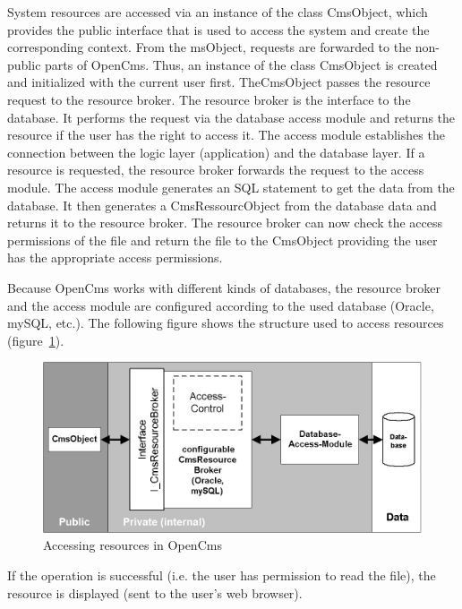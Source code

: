System resources are accessed via an instance of the class {\name CmsObject},
which provides the public interface that is used to access the system
and create the corresponding context. From the {\name msObject}, requests are
forwarded to the non-public parts of OpenCms. Thus, an instance of the
class {\name CmsObject} is created and initialized with the current user first.
The{\name CmsObject} passes the resource request to the resource broker. The
{\name resource broker} is the interface to the database. It performs the
request via the database access module and returns the resource if the
user has the right to access it. The access module establishes the
connection between the logic layer (application) and the database layer.
If a resource is requested, the {\name resource broker} forwards the request to
the access module. The access module generates an SQL statement to get
the data from the database. It then generates a {\name CmsRessourcObject} from
the database data and returns it to the resource broker. The {\name resource
broker} can now check the access permissions of the file and return the
file to the {\name CmsObject} providing the user has the appropriate access
permissions.

Because OpenCms works with different kinds of databases, the {\name resource
broker} and the access module are configured according to the used
database (Oracle, mySQL, etc.).
The following figure shows the structure used to access resources (figure~\ref {Accessing2}).

\begin{figure}
\begin{center}
\includegraphics[clip,width=\sgw]{pics/modules/4}
\end{center}
\caption[Accessing resources in OpenCms]{Accessing resources in OpenCms}
\label{Accessing2}
\end{figure}

If the operation is successful (i.e. the user has permission to read
the file), the resource is displayed (sent to the user's web browser).

